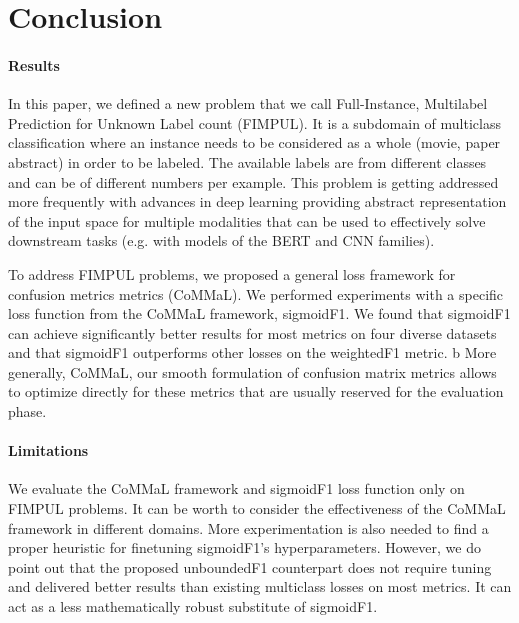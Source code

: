
\section{Conclusion}
\label{sec:orged3d8a1}


\paragraph{Results}
In this paper, we defined a new problem that we call Full-Instance, Multilabel Prediction for Unknown Label count (FIMPUL). It is a subdomain of multiclass classification where an instance needs to be considered as a whole (movie, paper abstract) in order to be labeled. The available labels are from different classes and can be of different numbers per example. This problem is getting addressed more frequently with advances in deep learning providing abstract representation of the input space for multiple modalities that can be used to effectively solve downstream tasks (e.g. with models of the BERT and CNN families). 

To address FIMPUL problems, we proposed a general loss framework for confusion metrics metrics (CoMMaL). We performed  experiments with a specific loss function from the CoMMaL framework, sigmoidF1. We found that sigmoidF1 can achieve significantly better results for most metrics on four diverse datasets and that sigmoidF1 outperforms other losses on the weightedF1 metric.
b
More generally, CoMMaL, our smooth formulation of confusion matrix metrics allows to optimize directly for these metrics that are usually reserved for the evaluation phase. 

\paragraph{Limitations}
We evaluate the CoMMaL framework and sigmoidF1 loss function only on FIMPUL problems. It can be worth to consider the effectiveness of the CoMMaL framework in different domains. More experimentation is also needed to find a proper heuristic for finetuning sigmoidF1's hyperparameters. However, we do point out that the proposed unboundedF1 counterpart does not require tuning and delivered better results than existing multiclass losses on most metrics. It can act as a less mathematically robust substitute of sigmoidF1.

